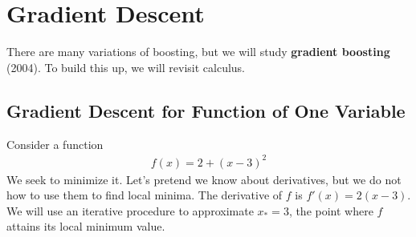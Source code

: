 \documentclass[12pt, a4paper]{article}
\theoremstyle{definition}
\begin{document}
	\section{Gradient Descent}
	There are many variations of boosting, but we will study \textbf{gradient boosting} (2004).
	To build this up, we will revisit calculus.
	
	\subsection*{Gradient Descent for Function of One Variable}
	
	Consider a function
	\begin{align*}
		f(x) = 2 + (x - 3)^2
	\end{align*}
	We seek to minimize it. Let's pretend we know about derivatives, but we do
	not how to use them to find local minima. The derivative of $f$ is $f'(x) = 2(x - 3)$.
	We will use an iterative procedure to approximate $x_* = 3$, the point where $f$
	attains its local minimum value.
	
\end{document}
